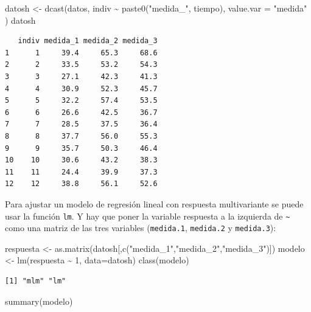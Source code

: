 \documentclass[
]{book}
\newenvironment{Shaded}{\begin{snugshade}}{\end{snugshade}}
\newcommand{\AttributeTok}[1]{\textcolor[rgb]{0.77,0.63,0.00}{#1}}
\newcommand{\DecValTok}[1]{\textcolor[rgb]{0.00,0.00,0.81}{#1}}
\newcommand{\FunctionTok}[1]{\textcolor[rgb]{0.00,0.00,0.00}{#1}}
\newcommand{\NormalTok}[1]{#1}
\newcommand{\OtherTok}[1]{\textcolor[rgb]{0.56,0.35,0.01}{#1}}
\newcommand{\SpecialCharTok}[1]{\textcolor[rgb]{0.00,0.00,0.00}{#1}}
\newcommand{\StringTok}[1]{\textcolor[rgb]{0.31,0.60,0.02}{#1}}
\begin{document}
\begin{Shaded}
\begin{Highlighting}[]
\NormalTok{datosh }\OtherTok{\textless{}{-}} \FunctionTok{dcast}\NormalTok{(datos, indiv }\SpecialCharTok{\textasciitilde{}} \FunctionTok{paste0}\NormalTok{(}\StringTok{"medida\_"}\NormalTok{, tiempo),}
                 \AttributeTok{value.var =} \StringTok{"medida"}\NormalTok{ )}
\NormalTok{datosh}
\end{Highlighting}
\end{Shaded}

\begin{verbatim}
   indiv medida_1 medida_2 medida_3
1      1     39.4     65.3     68.6
2      2     33.5     53.2     54.3
3      3     27.1     42.3     41.3
4      4     30.9     52.3     45.7
5      5     32.2     57.4     53.5
6      6     26.6     42.5     36.7
7      7     28.5     37.5     36.4
8      8     37.7     56.0     55.3
9      9     35.7     50.3     46.4
10    10     30.6     43.2     38.3
11    11     24.4     39.9     37.3
12    12     38.8     56.1     52.6
\end{verbatim}

Para ajustar un modelo de regresión lineal con respuesta multivariante se puede usar la función \texttt{lm}. Y hay que poner la variable respuesta a la izquierda de \texttt{\textasciitilde{}} como una matriz de las tres variables (\texttt{medida.1}, \texttt{medida.2} y \texttt{medida.3}):

\begin{Shaded}
\begin{Highlighting}[]
\NormalTok{respuesta }\OtherTok{\textless{}{-}} \FunctionTok{as.matrix}\NormalTok{(datosh[,}\FunctionTok{c}\NormalTok{(}\StringTok{"medida\_1"}\NormalTok{,}\StringTok{"medida\_2"}\NormalTok{,}\StringTok{"medida\_3"}\NormalTok{)])}
\NormalTok{modelo }\OtherTok{\textless{}{-}} \FunctionTok{lm}\NormalTok{(respuesta }\SpecialCharTok{\textasciitilde{}} \DecValTok{1}\NormalTok{, }\AttributeTok{data=}\NormalTok{datosh)}
\FunctionTok{class}\NormalTok{(modelo)}
\end{Highlighting}
\end{Shaded}

\begin{verbatim}
[1] "mlm" "lm" 
\end{verbatim}

\begin{Shaded}
\begin{Highlighting}[]
\FunctionTok{summary}\NormalTok{(modelo)}
\end{Highlighting}
\end{Shaded}
\end{document}
